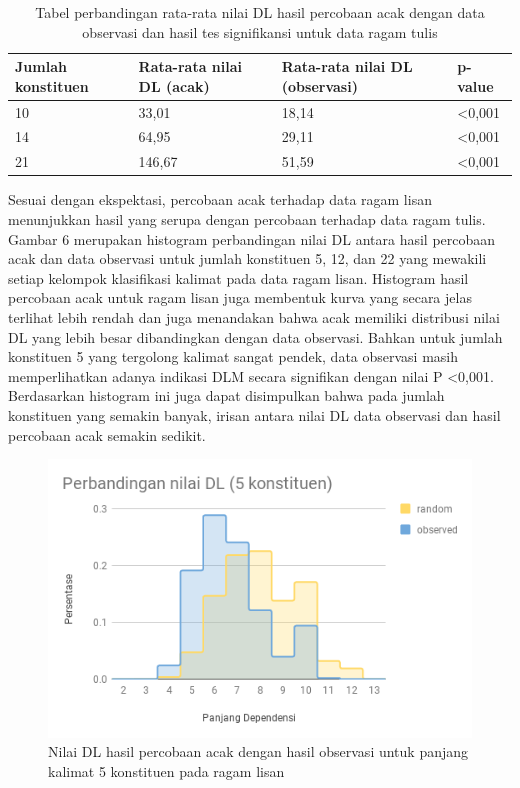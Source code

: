 \begin{table}
\begin{center}
\begin{small}
  \caption{Tabel perbandingan rata-rata nilai DL hasil percobaan acak dengan data observasi dan hasil tes signifikansi untuk data ragam tulis}  \label{tab:perbandingan_DL_tulis}
  \begin{tabular}{ | l | l | l | l |}
    \hline
    	Jumlah konstituen & Rata-rata nilai DL (acak) & Rata-rata nilai DL (observasi) & p-value \\ \hline
	10 & 33,01 & 18,14 & \textless 0,001 \\ \hline
	14 & 64,95 & 29,11 & \textless 0,001 \\ \hline
	21 & 146,67 & 51,59 & \textless 0,001 \\ \hline
  \end{tabular}
  \end{small}
\end{center}
\end{table}

Sesuai dengan ekspektasi, percobaan acak terhadap data ragam lisan menunjukkan hasil yang serupa dengan percobaan terhadap data ragam tulis. Gambar 6 merupakan histogram perbandingan nilai DL antara hasil percobaan acak dan data observasi untuk jumlah konstituen 5, 12, dan 22 yang mewakili setiap kelompok klasifikasi kalimat pada data ragam lisan. Histogram hasil percobaan acak untuk ragam lisan juga membentuk kurva yang secara jelas terlihat lebih rendah dan juga menandakan bahwa  acak memiliki distribusi nilai DL yang lebih besar dibandingkan dengan data observasi. Bahkan untuk jumlah konstituen 5 yang tergolong kalimat sangat pendek, data observasi masih memperlihatkan adanya indikasi DLM secara signifikan dengan nilai P \textless 0,001. Berdasarkan histogram ini juga dapat disimpulkan bahwa pada jumlah konstituen yang semakin banyak, irisan antara nilai DL data observasi dan hasil percobaan acak semakin sedikit.

\begin{figure}
	\centering \includegraphics[width=1
	\textwidth] {pics/l5randomobs.png} 
	\caption{ Nilai DL hasil percobaan acak dengan hasil observasi untuk panjang kalimat 5 konstituen pada ragam lisan} 
	\label{fig:l5randomobs} 
\end{figure}

